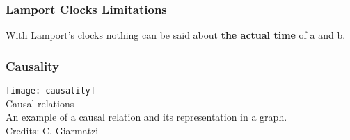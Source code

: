 \documentclass[aspectratio=169, 15pt,usenames,dvipsnames]{beamer}
\begin{document}
	\begin{gdblank}
		\frametitle{Lamport Clocks Limitations}
		\centering
		\LARGE
		With Lamport’s clocks nothing can be said about \textbf{the actual time} of a and b.
	\end{gdblank}
	\begin{gdblank}
		\frametitle{Causality} 
		\texttt{[image: causality]}
		\centering\\Causal relations\\An example of a causal relation and its representation in a graph. 
		\tiny \\Credits: C. Giarmatzi
	\end{gdblank}   
\end{document}

